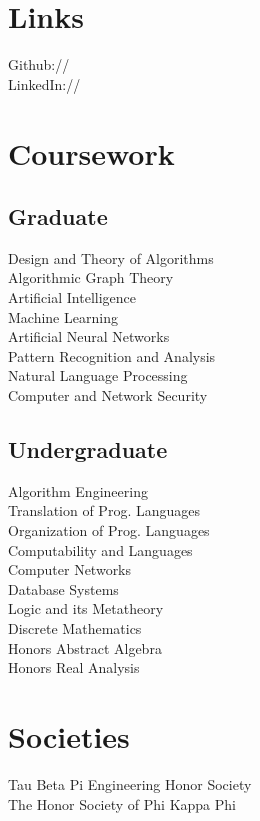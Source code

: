 \documentclass[]{deedy-resume-openfont}
\begin{document}
\begin{minipage}[t]{0.33\textwidth}
\section{Links} 
Github:// \href{https://github.com/rileyannis}{} \\
LinkedIn://  \href{https://www.linkedin.com/in/rileyannis}{} \\
\sectionsep


\section{Coursework}
\subsection{Graduate}
Design and Theory of Algorithms\\
Algorithmic Graph Theory\\
Artificial Intelligence\\
Machine Learning\\
Artificial Neural Networks\\
Pattern Recognition and Analysis\\
Natural Language Processing\\
Computer and Network Security\\
\sectionsep

\subsection{Undergraduate}
Algorithm Engineering\\
Translation of Prog. Languages\\
Organization of Prog. Languages\\
Computability and Languages\\
Computer Networks\\
Database Systems\\
Logic and its Metatheory\\
Discrete Mathematics\\
Honors Abstract Algebra\\
Honors Real Analysis\\
\sectionsep


\section{Societies} 
Tau Beta Pi Engineering Honor Society\\
The Honor Society of Phi Kappa Phi\\
\sectionsep


%
%

\end{minipage} 
\end{document}
